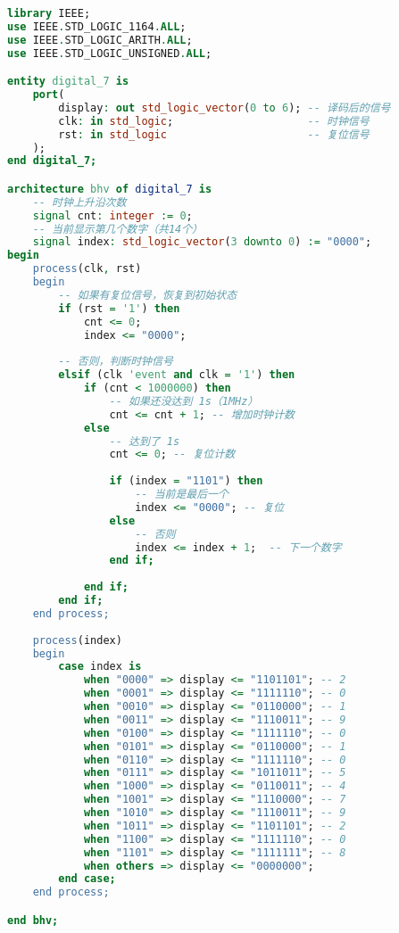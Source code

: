 \documentclass[a4paper]{article}
\begin{document}
\begin{lstlisting}[language=vhdl]
library IEEE;
use IEEE.STD_LOGIC_1164.ALL;
use IEEE.STD_LOGIC_ARITH.ALL;
use IEEE.STD_LOGIC_UNSIGNED.ALL;

entity digital_7 is
    port(
        display: out std_logic_vector(0 to 6); -- 译码后的信号
        clk: in std_logic;                     -- 时钟信号
        rst: in std_logic                      -- 复位信号
    );
end digital_7;

architecture bhv of digital_7 is
    -- 时钟上升沿次数
    signal cnt: integer := 0;
    -- 当前显示第几个数字（共14个）
    signal index: std_logic_vector(3 downto 0) := "0000";
begin    
    process(clk, rst)
    begin
        -- 如果有复位信号，恢复到初始状态
        if (rst = '1') then
            cnt <= 0;
            index <= "0000";
        
        -- 否则，判断时钟信号
        elsif (clk 'event and clk = '1') then
            if (cnt < 1000000) then
                -- 如果还没达到 1s（1MHz）
                cnt <= cnt + 1; -- 增加时钟计数
            else
                -- 达到了 1s
                cnt <= 0; -- 复位计数
                
                if (index = "1101") then
                    -- 当前是最后一个
                    index <= "0000"; -- 复位
                else
                    -- 否则
                    index <= index + 1;  -- 下一个数字
                end if;
                
            end if;
        end if;
    end process;
    
    process(index)
    begin
        case index is
            when "0000" => display <= "1101101"; -- 2
            when "0001" => display <= "1111110"; -- 0
            when "0010" => display <= "0110000"; -- 1
            when "0011" => display <= "1110011"; -- 9
            when "0100" => display <= "1111110"; -- 0
            when "0101" => display <= "0110000"; -- 1
            when "0110" => display <= "1111110"; -- 0
            when "0111" => display <= "1011011"; -- 5
            when "1000" => display <= "0110011"; -- 4
            when "1001" => display <= "1110000"; -- 7
            when "1010" => display <= "1110011"; -- 9
            when "1011" => display <= "1101101"; -- 2
            when "1100" => display <= "1111110"; -- 0
            when "1101" => display <= "1111111"; -- 8
            when others => display <= "0000000";
        end case;
    end process;

end bhv;
\end{lstlisting}
\end{document}
